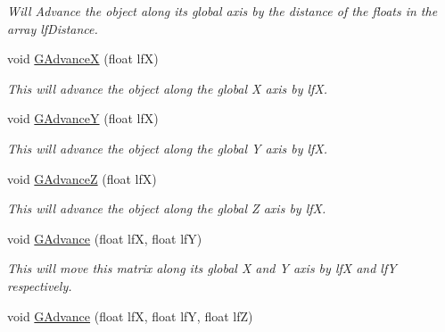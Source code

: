 \begin{DoxyCompactItemize}
\begin{DoxyCompactList}\small\item\em Will Advance the object along its global axis by the distance of the floats in the array lfDistance. \end{DoxyCompactList}\item 
\hypertarget{classc_matrix4_a6796b615c465903d48fe0c8094b1f7c1}{
void \hyperlink{classc_matrix4_a6796b615c465903d48fe0c8094b1f7c1}{GAdvanceX} (float lfX)}
\label{classc_matrix4_a6796b615c465903d48fe0c8094b1f7c1}

\begin{DoxyCompactList}\small\item\em This will advance the object along the global X axis by lfX. \end{DoxyCompactList}\item 
\hypertarget{classc_matrix4_af4453f95ef875b0c5002d72bade65bb1}{
void \hyperlink{classc_matrix4_af4453f95ef875b0c5002d72bade65bb1}{GAdvanceY} (float lfX)}
\label{classc_matrix4_af4453f95ef875b0c5002d72bade65bb1}

\begin{DoxyCompactList}\small\item\em This will advance the object along the global Y axis by lfX. \end{DoxyCompactList}\item 
\hypertarget{classc_matrix4_a0fd4e894762e73050e8e2e38acdfaf0d}{
void \hyperlink{classc_matrix4_a0fd4e894762e73050e8e2e38acdfaf0d}{GAdvanceZ} (float lfX)}
\label{classc_matrix4_a0fd4e894762e73050e8e2e38acdfaf0d}

\begin{DoxyCompactList}\small\item\em This will advance the object along the global Z axis by lfX. \end{DoxyCompactList}\item 
\hypertarget{classc_matrix4_a2dc12cbe708c7bc63ca2beff47c0c835}{
void \hyperlink{classc_matrix4_a2dc12cbe708c7bc63ca2beff47c0c835}{GAdvance} (float lfX, float lfY)}
\label{classc_matrix4_a2dc12cbe708c7bc63ca2beff47c0c835}

\begin{DoxyCompactList}\small\item\em This will move this matrix along its global X and Y axis by lfX and lfY respectively. \end{DoxyCompactList}\item 
\hypertarget{classc_matrix4_ac1c16ceb7ac4c2f771fc0d4662df643c}{
void \hyperlink{classc_matrix4_ac1c16ceb7ac4c2f771fc0d4662df643c}{GAdvance} (float lfX, float lfY, float lfZ)}
\label{classc_matrix4_ac1c16ceb7ac4c2f771fc0d4662df643c}


\end{DoxyCompactItemize}
